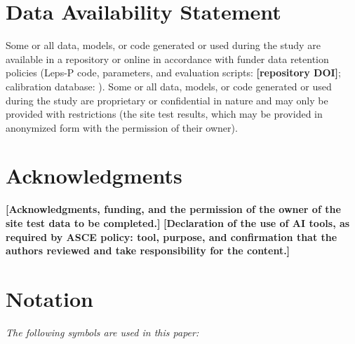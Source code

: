 \documentclass[Journal,letterpaper]{ascelike-new}
\begin{document}
\section{Data Availability Statement}
\noindent Some or all data, models, or code generated or used during the study are available in a repository or online in accordance with funder data retention policies (Leps-P code, parameters, and evaluation scripts: \textbf{[repository DOI]}; calibration database: ). Some or all data, models, or code generated or used during the study are proprietary or confidential in nature and may only be provided with restrictions (the site test results, which may be provided in anonymized form with the permission of their owner).

\section{Acknowledgments}
\noindent \textbf{[Acknowledgments, funding, and the permission of the owner of the site test data to be completed.]} \textbf{[Declaration of the use of AI tools, as required by ASCE policy: tool, purpose, and confirmation that the authors reviewed and take responsibility for the content.]}

\section{Notation}
\noindent \textit{The following symbols are used in this paper:}
\end{document}
